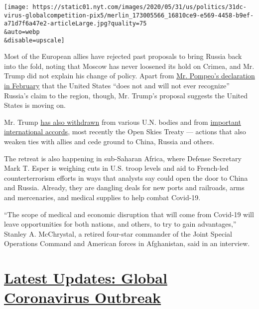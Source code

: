 \texttt{[image: https://static01.nyt.com/images/2020/05/31/us/politics/31dc-virus-globalcompetition-pix5/merlin\_173005566\_16810ce9-e569-4458-b9ef-a71d7f6a47e2-articleLarge.jpg?quality=75\\\&auto=webp\\\&disable=upscale]}

Most of the European allies have rejected past proposals to bring Russia
back into the fold, noting that Moscow has never loosened its hold on
Crimea, and Mr. Trump did not explain his change of policy. Apart from
\href{https://twitter.com/SecPompeo/status/1232851640698404864?s=20}{Mr.
Pompeo's declaration in February} that the United States ``does not and
will not ever recognize'' Russia's claim to the region, though, Mr.
Trump's proposal suggests the United States is moving on.

Mr. Trump
\href{https://www.nytimes.com/2018/06/19/us/politics/trump-israel-palestinians-human-rights.html}{has
also withdrawn} from various U.N. bodies and from
\href{https://www.nytimes.com/2017/06/01/climate/trump-paris-climate-agreement.html}{important
international accords}, most recently the Open Skies Treaty --- actions
that also weaken ties with allies and cede ground to China, Russia and
others.

The retreat is also happening in sub-Saharan Africa, where Defense
Secretary Mark T. Esper is weighing cuts in U.S. troop levels and aid to
French-led counterterrorism efforts in ways that analysts say could open
the door to China and Russia. Already, they are dangling deals for new
ports and railroads, arms and mercenaries, and medical supplies to help
combat Covid-19.

``The scope of medical and economic disruption that will come from
Covid-19 will leave opportunities for both nations, and others, to try
to gain advantages,'' Stanley A. McChrystal, a retired four-star
commander of the Joint Special Operations Command and American forces in
Afghanistan, said in an interview.

\hypertarget{latest-updates-global-coronavirus-outbreak}{%
\section{\texorpdfstring{\href{https://www.nytimes.com/2020/08/01/world/coronavirus-covid-19.html?action=click\&pgtype=Article\&state=default\&region=MAIN_CONTENT_1\&context=storylines_live_updates}{Latest
Updates: Global Coronavirus
Outbreak}}{Latest Updates: Global Coronavirus Outbreak}}\label{latest-updates-global-coronavirus-outbreak}}

